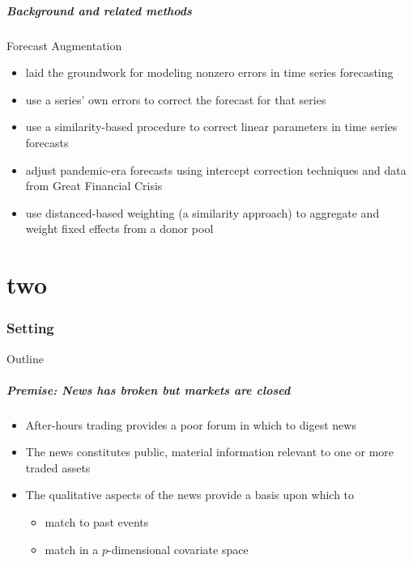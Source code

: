 \documentclass[9pt]{beamer}
\theoremstyle{definition}
\begin{document}
\begin{frame}
    \frametitle{Background and related methods}

    Forecast Augmentation
    \begin{itemize}
        \item \cite[][]{clements1996intercept,clements1998forecasting} laid the groundwork for modeling nonzero errors in time series forecasting
        \item \cite[][]{guerron2017macroeconomic} use a series' own errors to correct the forecast for that series
        \item \cite[][]{dendramis2020similarity} use a similarity-based procedure to correct linear parameters in time series forecasts
        \item \cite[][]{foroni2022forecasting} adjust pandemic-era forecasts using intercept correction techniques and data from Great Financial Crisis
        \item \cite[][]{lin2021minimizing} use distanced-based weighting (a similarity approach) to aggregate and weight fixed effects from a donor pool
    \end{itemize}
\end{frame}

\part{two}
\section{Setting}
\begin{frame}{Outline} %
    \tableofcontents[part=1,currentsection]\tableofcontents
\end{frame}


\begin{frame}
\frametitle{Premise: News has broken but markets are closed}

\begin{itemize}
\item After-hours trading provides a poor forum in which to digest news
\item The news constitutes public, material information relevant to one or more traded assets
\item The qualitative aspects of the news provide a basis upon which to 
\begin{itemize}
    \item match to past events
    \item match in a $p$-dimensional covariate space
\end{itemize}
\end{itemize}
\end{frame}
\end{document}
